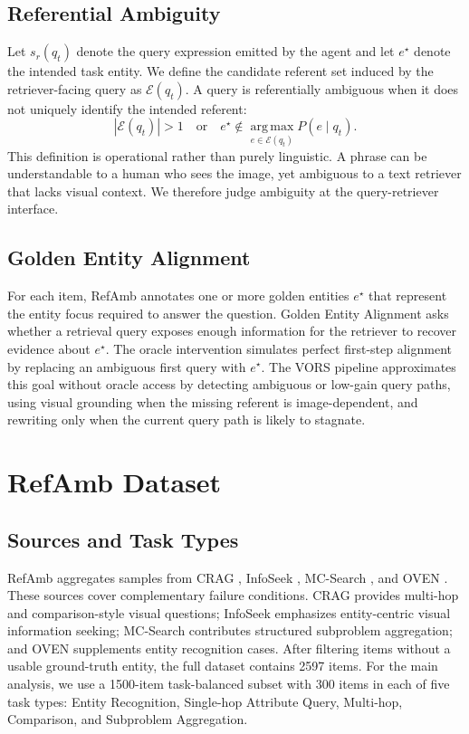 \documentclass{article}
\newcommand{\query}{q}
\newcommand{\entity}{e}
\newcommand{\gold}{e^\star}
\begin{document}
\subsection{Referential Ambiguity}
Let $s_r(\query_t)$ denote the query expression emitted by the agent and let $\entity^\star$ denote the intended task entity.
We define the candidate referent set induced by the retriever-facing query as $\mathcal{E}(\query_t)$.
A query is referentially ambiguous when it does not uniquely identify the intended referent:
\begin{equation}
    |\mathcal{E}(\query_t)| > 1
    \quad \text{or} \quad
    \entity^\star \notin \operatorname*{arg\,max}_{\entity \in \mathcal{E}(\query_t)} P(\entity \mid \query_t).
\end{equation}
This definition is operational rather than purely linguistic.
A phrase can be understandable to a human who sees the image, yet ambiguous to a text retriever that lacks visual context.
We therefore judge ambiguity at the query-retriever interface.

\subsection{Golden Entity Alignment}
For each item, RefAmb annotates one or more golden entities $\gold$ that represent the entity focus required to answer the question.
Golden Entity Alignment asks whether a retrieval query exposes enough information for the retriever to recover evidence about $\gold$.
The oracle intervention simulates perfect first-step alignment by replacing an ambiguous first query with $\gold$.
The VORS pipeline approximates this goal without oracle access by detecting ambiguous or low-gain query paths, using visual grounding when the missing referent is image-dependent, and rewriting only when the current query path is likely to stagnate.

\section{RefAmb Dataset}
\subsection{Sources and Task Types}
RefAmb aggregates samples from CRAG \cite{yang2024crag}, InfoSeek \cite{chen2023can}, MC-Search \cite{ning2026mc}, and OVEN \cite{hu2023open}.
These sources cover complementary failure conditions.
CRAG provides multi-hop and comparison-style visual questions; InfoSeek emphasizes entity-centric visual information seeking; MC-Search contributes structured subproblem aggregation; and OVEN supplements entity recognition cases.
After filtering items without a usable ground-truth entity, the full dataset contains 2597 items.
For the main analysis, we use a 1500-item task-balanced subset with 300 items in each of five task types: Entity Recognition, Single-hop Attribute Query, Multi-hop, Comparison, and Subproblem Aggregation.
\end{document}
